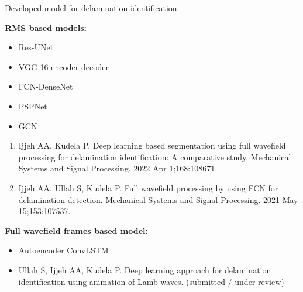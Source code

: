 \documentclass[10pt,aspectratio=169]{beamer} %
\begin{document}
\begin{frame}{Developed model for delamination identification}
	\begin{minipage}[t]{0.45\textwidth}
		\textbf{RMS based models: \\}
			\begin{itemize}
				\item Res-UNet
				\item VGG 16 encoder-decoder
				\item FCN-DenseNet
				\item PSPNet
				\item GCN
			\end{itemize}
		{\tiny 
			\begin{enumerate}
				\item Ijjeh AA, Kudela P. Deep learning based segmentation using full wavefield processing for delamination identification: A comparative study. Mechanical Systems and Signal Processing. 2022 Apr 1;168:108671.
				\item Ijjeh AA, Ullah S, Kudela P. Full wavefield processing by using FCN for delamination detection. Mechanical Systems and Signal Processing. 2021 May 15;153:107537.
				
			\end{enumerate}}
	\end{minipage}
	\hfill
	\begin{minipage}[t]{.45\textwidth}
	\textbf{Full wavefield frames based model:}
		\begin{itemize}
			\item Autoencoder ConvLSTM
		\end{itemize}
	\tiny
	\begin{itemize}
		\item Ullah S, Ijjeh AA, Kudela P. Deep learning approach for delamination identification using animation of Lamb waves. (submitted / under review)
	\end{itemize}
	
	\end{minipage}
\end{frame}
%
\end{document}
